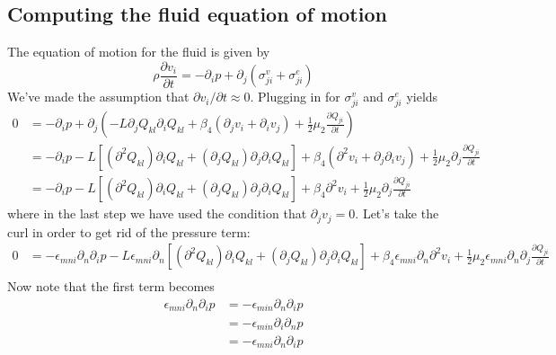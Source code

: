 \documentclass[reqno]{article}
\begin{document}
	\subsection{Computing the fluid equation of motion}
	The equation of motion for the fluid is given by
	\begin{equation}\label{eq:fluid-eom}
		\rho \frac{\partial v_i}{\partial t} = -\partial_i p + \partial_j (\sigma^v_{ji} + \sigma^{e}_{ji})
	\end{equation}
	We've made the assumption that $\partial v_i/\partial t \approx 0$. Plugging in for $\sigma^v_{ji}$ and $\sigma^e_{ji}$ yields
	\begin{equation}
	\begin{split}
		0 &= -\partial_i p + \partial_j \left( -L\partial_j Q_{kl} \partial_i Q_{kl} + \beta_4 (\partial_j v_i + \partial_i v_j) + \frac{1}{2} \mu_2  \frac{\partial Q_{ji}}{\partial t} \right) \\
		&= -\partial_i p - L\left[(\partial^2 Q_{kl}) \partial_i Q_{kl} + (\partial_j Q_{kl}) \partial_j \partial_i Q_{kl}\right] + \beta_4(\partial^2 v_i + \partial_j \partial_i v_j) + \frac{1}{2} \mu_2 \partial_j \frac{\partial Q_{ji}}{\partial t} \\
		&= -\partial_i p - L\left[(\partial^2 Q_{kl}) \partial_i Q_{kl} + (\partial_j Q_{kl}) \partial_j \partial_i Q_{kl}\right] + \beta_4\partial^2 v_i + \frac{1}{2} \mu_2 \partial_j \frac{\partial Q_{ji}}{\partial t}
	\end{split}
	\end{equation}
	where in the last step we have used the condition that $\partial_j v_j = 0$. Let's take the curl in order to get rid of the pressure term:
	\begin{equation}
	\begin{split}
		0 &= -\epsilon_{mni}\partial_n\partial_i p - L\epsilon_{mni}\partial_n\left[(\partial^2 Q_{kl}) \partial_i Q_{kl} + (\partial_j Q_{kl}) \partial_j \partial_i Q_{kl}\right] + \beta_4 \epsilon_{mni}\partial_n \partial^2 v_i + \frac{1}{2}\mu_2\epsilon_{mni}\partial_n \partial_j\frac{\partial Q_{ji}}{\partial t} \\
	\end{split}
	\end{equation}
	Now note that the first term becomes
	\begin{equation}
	\begin{split}
		\epsilon_{mni}\partial_n\partial_i p &= -\epsilon_{min}\partial_n\partial_i p \\
		&= -\epsilon_{min}\partial_i\partial_n p \\
		&= -\epsilon_{mni}\partial_n\partial_i p
	\end{split}
	\end{equation}
\end{document}
